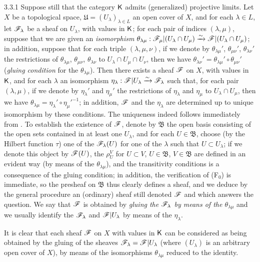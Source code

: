\begin{env}{3.3.1}
\label{env-0.3.3.1}
Suppose still that the category $\mathsf{K}$ admits (generalized) projective limits. Let
$X$ be a topological space, $\mathfrak{U}=(U_\lambda)_{\lambda\in L}$ an open
cover of $X$, and for each $\lambda\in L$, let $\mathscr{F}_\lambda$ be a sheaf on
$U_\lambda$, with values in $\mathsf{K}$; for each pair of indices $(\lambda,\mu)$,
suppose that we are given an \emph{isomorphism}
$\theta_{\lambda\mu}:\mathscr{F}_\mu|(U_\lambda\cap U_\mu)
  \xrightarrow{\sim}\mathscr{F}|(U_\lambda\cap U_\mu)$; in addition, suppose that for each triple
$(\lambda,\mu,\nu)$, if we denote by $\theta_{\lambda\mu}'$, $\theta_{\mu\nu}'$,
$\theta_{\lambda\nu}'$ the restrictions of $\theta_{\lambda\mu}$,
$\theta_{\mu\nu}$, $\theta_{\lambda\nu}$ to $U_\lambda\cap U_\mu\cap U_\nu$,
then we have $\theta_{\lambda\nu}'=\theta_{\lambda\mu}'\circ\theta_{\mu\nu}'$
(\emph{gluing condition} for the $\theta_{\lambda\mu}$). Then there exists a
sheaf $\mathscr{F}$ on $X$, with values in $\mathsf{K}$, and for each $\lambda$ an
isomorphism $\eta_\lambda:\mathscr{F}|U_\lambda\xrightarrow{\sim}\mathscr{F}_\lambda$ such that, for
each pair $(\lambda,\mu)$, if we denote by $\eta_\lambda'$ and $\eta_\mu'$ the
restrictions of $\eta_\lambda$ and $\eta_\mu$ to $U_\lambda\cap U_\mu$, then we
have $\theta_{\lambda\mu}=\eta_\lambda'\circ{\eta_\mu'}^{-1}$; in addition,
$\mathscr{F}$ and the $\eta_\lambda$ are determined up to unique isomorphism by these
conditions. The uniqueness indeed follows immediately from . To
establish the existence of $\mathscr{F}$, denote by $\mathfrak{B}$ the open basis
consisting of the open sets contained in at least one $U_\lambda$, and for each
$U\in\mathfrak{B}$, choose (by the Hilbert function $\tau$) one of the
$\mathscr{F}_\lambda(U)$ for one of the $\lambda$ such that $U\subset U_\lambda$; if
we denote this object by $\mathscr{F}(U)$, the $\rho_U^V$ for $U\subset V$,
$U\in\mathfrak{B}$, $V\in\mathfrak{B}$ are defined in an evident way (by means
of the $\theta_{\lambda\mu}$), and the transitivity conditions is a consequence
of the gluing condition; in addition, the verification of (F$_0$) is immediate,
so the presheaf on $\mathfrak{B}$ thus clearly defines a sheaf, and we deduce by
the general procedure  an (ordinary) sheaf still denoted
$\mathscr{F}$ and which answers the question. We say that $\mathscr{F}$ is obtained by
\emph{gluing the $\mathscr{F}_\lambda$ by means of the $\theta_{\lambda\mu}$} and we
usually identify the $\mathscr{F}_\lambda$ and $\mathscr{F}|U_\lambda$ by means of the
$\eta_\lambda$.

It is clear that each sheaf $\mathscr{F}$ on $X$ with values in $\mathsf{K}$ can be
considered as being obtained by the gluing of the sheaves
$\mathscr{F}_\lambda=\mathscr{F}|U_\lambda$ (where $(U_\lambda)$ is an arbitrary open
cover of $X$), by means of the isomorphisms $\theta_{\lambda\mu}$ reduced to the
identity.
\end{env}

